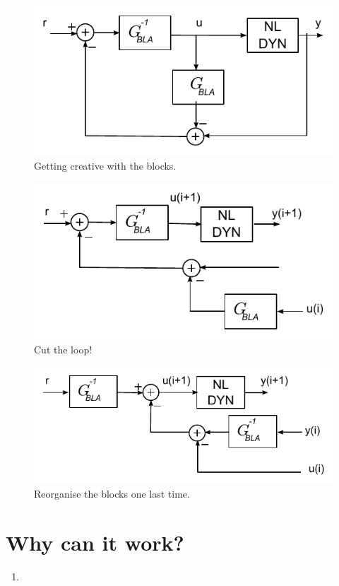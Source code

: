 		\begin{figure}[hbtp]
			\centering
			\includegraphics{images/lego4}
			\caption{Getting creative with the blocks. }
		\end{figure}

		\begin{figure}[hbtp]
			\centering
			\includegraphics{images/lego5}
			\caption{Cut the loop! }
		\end{figure}

		\begin{figure}[hbtp]
			\includegraphics{images/lego6}
			\caption{Reorganise the blocks one last time. }
		\end{figure}

\section{Why can it work?}

\begin{enumerate}
	\item 
\end{enumerate}